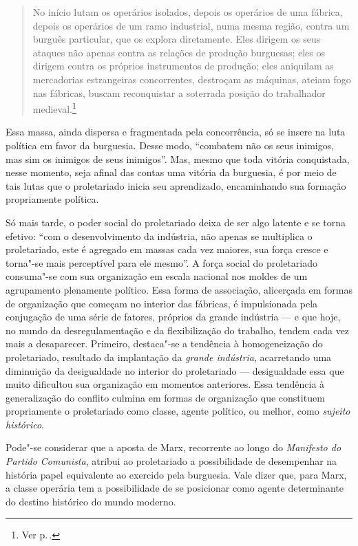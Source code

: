 \begin{quote} 
No início lutam os operários isolados, depois os operários de uma
fábrica, depois os operários de um ramo industrial, numa mesma região,
contra um burguês particular, que os explora diretamente. Eles dirigem os seus
ataques não apenas contra as relações de produção burguesas; eles os
dirigem contra os próprios instrumentos de produção; eles aniquilam as
mercadorias estrangeiras concorrentes, destroçam as máquinas, ateiam
fogo nas fábricas, buscam reconquistar a soterrada posição do
trabalhador medieval.\footnote{Ver p.\,\pageref{6}.}
\end{quote} 

Essa massa, ainda dispersa e fragmentada pela concorrência, só
se insere na luta política em favor da burguesia. Desse modo,
``combatem não os seus inimigos, mas sim os inimigos de seus inimigos''.
Mas, mesmo que toda vitória conquistada, nesse momento, seja afinal das
contas uma vitória da burguesia, é por meio de tais lutas que o
proletariado inicia seu aprendizado, encaminhando sua formação
propriamente política.

Só mais tarde, o poder social do proletariado deixa de ser algo latente
e se torna efetivo: ``com o desenvolvimento da indústria, não apenas
se multiplica o proletariado, este é agregado em massas cada vez maiores,
sua força cresce e torna"-se mais perceptível para ele mesmo''. A força
social do proletariado consuma"-se com sua organização em escala
nacional nos moldes de um agrupamento plenamente político. Essa forma
de associação, alicerçada em formas de organização que começam no
interior das fábricas, é impulsionada pela conjugação de uma série de
fatores, próprios da grande indústria --- e que hoje, no mundo da
desregulamentação e da flexibilização do trabalho, tendem cada vez mais
a desaparecer. Primeiro, destaca"-se a tendência à homogeneização do
proletariado, resultado da implantação da \textit{grande indústria},
acarretando uma diminuição da desigualdade no interior do proletariado
--- desigualdade essa que muito dificultou sua organização em momentos
anteriores. Essa tendência à generalização do conflito culmina em
formas de organização que constituem propriamente o proletariado como
classe, agente político, ou melhor, como \textit{sujeito histórico}.

Pode"-se considerar que a aposta de Marx, recorrente ao longo do
\textit{Manifesto do Partido Comunista}, atribui ao proletariado a
possibilidade de desempenhar na história papel equivalente ao exercido
pela burguesia. Vale dizer que, para Marx, a classe operária tem a
possibilidade de se posicionar como agente determinante do destino
histórico do mundo moderno. 

